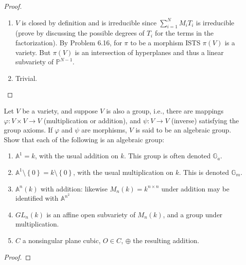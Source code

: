 \documentclass{solution}
\begin{document}
\begin{proof}
    \begin{enumerate}
        \item $V$ is closed by definition and is irreducible since $\sum\limits_{i = 1}^{N} M_iT_i$ is irreducible (prove by discussing the possible degrees of $T_i$ for the terms in the factorization). By Problem 6.16, for $\pi$ to be a morphism ISTS $\pi(V)$ is a variety. But $\pi(V)$ is an intersection of hyperplanes and thus a linear subvariety of $\mathbb{P}^{N - 1}$.
        \item Trivial.
    \end{enumerate}
\end{proof}

\begin{problem}{6.29}
    Let $V$ be a variety, and suppose $V$ is also a group, i.e., there are mappings $\varphi: V \times V \rightarrow V$ (multiplication or addition), and $\psi: V \rightarrow V$ (inverse) satisfying the group axioms. If $\varphi$ and $\psi$ are morphisms, $V$ is said to be an algebraic group. Show that each of the following is an algebraic group:
    \begin{enumerate}
        \item $\mathbb{A}^1 = k$, with the usual addition on $k$. This group is often denoted $\mathbb{G}_a$.
        \item $\mathbb{A}^1 \setminus \left\lbrace 0 \right\rbrace = k \setminus \left\lbrace 0 \right\rbrace$, with the usual multiplication on $k$. This is denoted $\mathbb{G}_m$.
        \item $\mathbb{A}^n(k)$ with addition: likewise $M_n(k) = k^{n \times n}$ under addition may be identified with $\mathbb{A}^{n^2}$
        \item $GL_n(k)$ is an affine open subvariety of $M_n(k)$, and a group under multiplication.
        \item $C$ a nonsingular plane cubic, $O \in C$, $\oplus$ the resulting addition.
    \end{enumerate}
\end{problem}

\begin{proof}
    \TODO
\end{proof}

\begin{problem}{6.30}
    \TODO
\end{problem}
\end{document}
